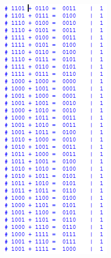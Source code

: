 \begin{figure}[H]
		\begin{subfigure}[b]{0.44\textwidth}
			\includegraphics[width=\textwidth]{img/etapa3/simulacaoSomadorCompleto4Bits_7}

\end{subfigure}
\end{figure}
